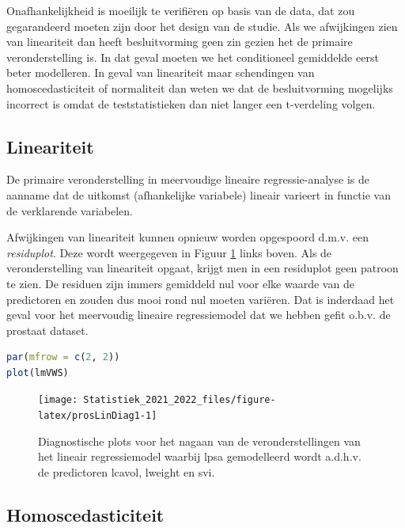 \documentclass[
  12pt,dutch,coursenotes]{book}
\theoremstyle{definition}
\theoremstyle{definition}
\theoremstyle{definition}
\theoremstyle{definition}
\theoremstyle{remark}
\begin{document}
Onafhankelijkheid is moeilijk te verifiëren op basis van de data, dat zou gegarandeerd moeten zijn door het design van de studie.
Als we afwijkingen zien van lineariteit dan heeft besluitvorming geen zin gezien het de primaire veronderstelling is.
In dat geval moeten we het conditioneel gemiddelde eerst beter modelleren.
In geval van lineariteit maar schendingen van homoscedasticiteit of normaliteit dan weten we dat de besluitvorming mogelijks incorrect is omdat de teststatistieken dan niet langer een t-verdeling volgen.

\hypertarget{lineariteit-1}{%
\subsection{Lineariteit}\label{lineariteit-1}}

De primaire veronderstelling in meervoudige lineaire regressie-analyse is de aanname dat de uitkomst (afhankelijke variabele) lineair varieert in functie van de verklarende variabelen.

Afwijkingen van lineariteit kunnen opnieuw worden opgespoord d.m.v. een \emph{residuplot}. Deze wordt weergegeven in Figuur \ref{fig:prosLinDiag1} links boven. Als de veronderstelling van lineariteit opgaat, krijgt men in een residuplot geen patroon te zien.
De residuen zijn immers gemiddeld nul voor elke waarde van de predictoren en zouden dus mooi rond nul moeten variëren.
Dat is inderdaad het geval voor het meervoudig lineaire regressiemodel dat we hebben gefit o.b.v. de prostaat dataset.

\begin{lstlisting}[language=R]
par(mfrow = c(2, 2))
plot(lmVWS)
\end{lstlisting}

\begin{figure}

{\centering \texttt{[image: Statistiek\_2021\_2022\_files/figure-latex/prosLinDiag1-1]} 

}

\caption{Diagnostische plots voor het nagaan van de veronderstellingen van het lineair regressiemodel waarbij lpsa gemodelleerd wordt a.d.h.v. de predictoren lcavol, lweight en svi.}\label{fig:prosLinDiag1}
\end{figure}

\hypertarget{homoscedasticiteit}{%
\subsection{Homoscedasticiteit}\label{homoscedasticiteit}}
\end{document}
